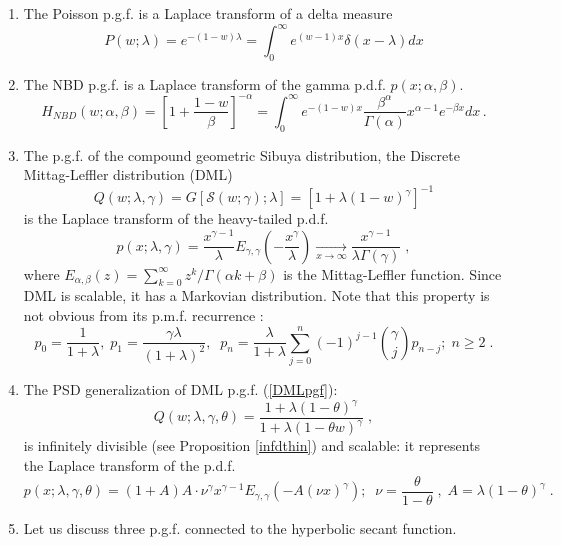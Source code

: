 \documentclass[a4paper,12pt]{amsart}
\theoremstyle{definition}
\theoremstyle{remark}
\begin{document}
\begin{enumerate}[label=(\roman*), leftmargin=*]
\item 
The Poisson p.g.f. is a Laplace transform of a delta measure
\begin{equation}\label{Poislapl}
P(w;\lambda)=e^{-(1-w)\lambda}=\int_0^{\infty}e^{ (w-1)x}\delta(x-\lambda)dx
\end{equation}
\item \label{NBDLap}
The NBD p.g.f. is a Laplace transform of the gamma p.d.f. $p(x;\alpha,\beta)$.
\begin{equation}\label{nbd2lap}
H_{NBD}(w;\alpha,\beta) = \left[1\!+\! \frac{1\!-\!w}{\beta}  \right]^{-\alpha} = \int_0^\infty e^{-(1-w)x}\frac{\beta^{\alpha}}{\Gamma(\alpha)}x^{\alpha-1}e^{-\beta x}dx\,.
\end{equation}

\item \label{DMLlap}
The p.g.f. of the compound geometric Sibuya distribution, the Discrete Mittag-Leffler distribution (DML) \cite{Pillai1995}
\begin{equation}\label{DMLpgf}
Q(w;\lambda,\gamma)=G[\mathcal{S}(w;\gamma);\lambda]=[1+\lambda(1-w)^{\gamma}]^{-1}
\end{equation}
is the Laplace transform of the heavy-tailed p.d.f. 
\begin{equation}\label{DMLpdf}
p(x;\lambda,\gamma)=
\frac{x^{\gamma-1}}{\lambda}E_{\gamma ,\gamma }\left(-\frac{x^{\gamma}}{\lambda}\right) \xrightarrow[x\to\infty]{}\frac{x^{\gamma -1}}{\lambda  \Gamma (\gamma )}\;,
\end{equation}
where $E_{\alpha ,\beta }(z)= \sum_{k=0}^{\infty}z^k/\Gamma(\alpha k +\beta)$ is the Mittag-Leffler function. Since DML is scalable, it has
a Markovian distribution. Note that this property is not obvious from its p.m.f. recurrence \cite{Pillai1995}:
\begin{equation}\label{DMLpmf}
p_0=\frac{1}{1+\lambda},\;p_1=\frac{\gamma \lambda}{(1+\lambda)^2},\;\;p_n=\frac{\lambda}{1+\lambda}\sum_{j=0}^n (-1)^{j-1}\binom{\gamma}{j}p_{n-j};\; n\geq 2\;.
\end{equation}
\item \label{DMLExtlap} 
The PSD generalization of DML p.g.f. (\ref{DMLpgf}):
\begin{equation}\label{DMLPSDpgf}
    Q(w;\lambda, \gamma, \theta) =
  \frac{1+\lambda(1-\theta)^{\gamma}}{1+\lambda(1-\theta w)^{\gamma}}\;,   
  \end{equation}
is infinitely divisible (see Proposition \ref{infdthin}) and scalable: it represents the Laplace transform of the p.d.f. 
\[
p(x;\lambda,\gamma, \theta)=(1+A)A\cdot \nu^{\gamma}x^{\gamma-1}E_{\gamma ,\gamma }\left(-A(\nu x)^{\gamma}\right);\;\;\nu=\frac{\theta}{1-\theta}\;,\; A=\lambda(1-\theta)^{\gamma}\;.
\]
\item \label{sechdist}
Let us discuss three p.g.f. connected to the hyperbolic secant function. 


\end{enumerate}
\end{document}
